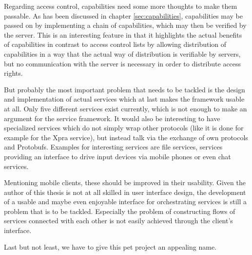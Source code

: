 Regarding access control, capabilities need some more thoughts to make them passable.
As has been discussed in chapter \ref{sec:capabilities}, capabilities may be passed on by implementing a chain of capabilities, which may then be verified by the server.
This is an interesting feature in that it highlights the actual benefits of capabilities in contrast to access control lists by allowing distribution of capabilities in a way that the actual way of distribution is verifiable by servers, but no communication with the server is necessary in order to distribute access rights.

But probably the most important problem that needs to be tackled is the design and implementation of actual services which at last makes the framework usable at all.
Only five different services exist currently, which  is not enough to make an argument for the service framework.
It would also be interesting to have specialized services which do not simply wrap other protocols (like it is done for example for the Xpra service), but instead talk via the exchange of own protocols and Protobufs.
Examples for interesting services are file services, services providing an interface to drive input devices via mobile phones or even chat services.

Mentioning mobile clients, these should be improved in their usability.
Given the author of this thesis is not at all skilled in user interface design, the development of a usable and maybe even enjoyable interface for orchestrating services is still a problem that is to be tackled.
Especially the problem of constructing flows of services connected with each other is not easily achieved through the client's interface.

Last but not least, we have to give this pet project an appealing name.

